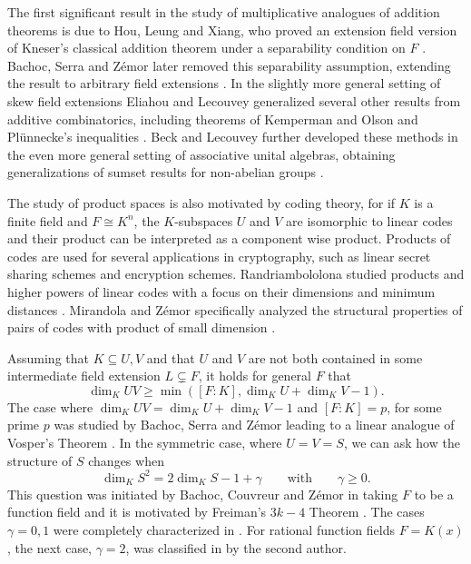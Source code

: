\documentclass[12pt]{amsart}
\renewcommand{\geq}{\geqslant}
\theoremstyle{definition}
\begin{document}
	The first significant result in the study of multiplicative analogues of addition theorems is due to Hou, Leung and Xiang, who proved an extension field version of Kneser's classical addition theorem under a separability condition on $F$ \cite{HLX02,Kne56}. Bachoc, Serra and Z\'emor later removed this separability assumption, extending the result to arbitrary field extensions \cite{BSZ18}. In the slightly more general setting of skew field extensions Eliahou and Lecouvey generalized several other results from additive combinatorics, including theorems of Kemperman and Olson \cite{eliahou09someadd} and Pl\"unnecke's inequalities \cite{lecouveyplunnecke}. Beck and Lecouvey further developed these methods in the even more general setting of associative unital algebras, obtaining generalizations of sumset results for non-abelian groups \cite{BL17}. 
	
	The study of product spaces is also motivated by coding theory, for if $K$ is a finite field and $F \cong K^n$, the $K$-subspaces $U$ and $V$ are isomorphic to linear codes and their product can be interpreted as a component wise product. Products of codes are used for several applications in cryptography, such as linear secret sharing schemes and encryption schemes. Randriambololona studied products and higher powers of linear codes with a focus on their dimensions and minimum distances \cite{Ran15}. Mirandola and Z\'emor specifically analyzed the structural properties of pairs of codes with product of small dimension \cite{MZ15}.
	
	Assuming that $K \subseteq U, V$ and that $U$ and $V$ are not both contained in some intermediate field extension $L \subsetneq F$, it holds for general $F$ that $$\dim_K UV\geq \min([F:K], \dim_K U + \dim_K V - 1).$$ 
	The case where $\dim_K UV = \dim_K U + \dim_K V - 1$ and $[F:K] = p$, for some prime $p$ was studied by Bachoc, Serra and Z\'emor leading to a linear analogue of Vosper's Theorem \cite{BSZ17}. In the symmetric case, where $U = V = S$, we can ask how the structure of $S$ changes when 
	$$\dim_K S^2=2\dim_K S-1+\gamma \qquad \text{with} \qquad \gamma \geq 0.$$
	This question was initiated by Bachoc, Couvreur and Z\'emor in \cite{bachoc2016freiman} taking $F$ to be a function field and it is motivated by Freiman's $3k-4$ Theorem \cite{freiman1973foundations}. The cases $\gamma=0, 1$ were completely characterized in \cite{bachoc2016freiman}. For rational function fields $F = K(x)$, the next case, $\gamma=2$, was classified in \cite{Wes24} by the second author. 
	
\end{document}
